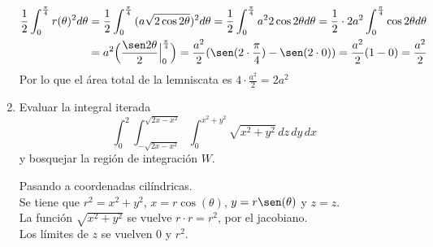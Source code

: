 \documentclass{article}
\begin{document}
\begin{enumerate}
{            \begin{align*}
                \frac{1}{2}\int_0^{\frac{\pi}{4}}{r(\theta)^2 d\theta}
                &= \frac{1}{2}\int_0^{\frac{\pi}{4}}{(a\sqrt{2\cos2\theta})^2 d\theta}
                = \frac{1}{2}\int_0^{\frac{\pi}{4}}{a^2 2\cos2\theta d\theta}
                = \frac{1}{2}\cdot 2a^2 \int_0^{\frac{\pi}{4}}{\cos2\theta d\theta}\\
                &= a^2 \Big (\frac{\sen 2\theta}{2} \Big |_0^{\frac{\pi}{4}} \Big )
                = \frac{a^2}{2} (\sen (2\cdot\frac{\pi}{4}) - \sen (2\cdot0))
                = \frac{a^2}{2} (1-0) = \frac{a^2}{2}
            \end{align*}
            Por lo que el área total de la lemniscata es
            $4 \cdot \frac{a^2}{2} = 2a^2$
        }

        \item {
            Evaluar la integral iterada
            \[
                \int_{0}^{2}{
                    \int_{-\sqrt{2x-x^2}}^{\sqrt{2x-x^2}}{
                        \int_{0}^{x^2+y^2}{
                            \sqrt{x^2+y^2}
                        \,dz}
                    \,dy}
                \,dx}
            \]
            y bosquejar la región de integración $W$.

            \color{azul}
            Pasando a coordenadas cilíndricas.\\
            Se tiene que $r^2 = x^2 + y^2$, $x = r\cos(\theta)$, $y = r\sen(\theta)$
            y $z = z$.\\
            La función $\sqrt{x^2+y^2}$ se vuelve $r \cdot r = r^2$, por el jacobiano.\\
            Los límites de $z$ se vuelven 0 y $r^2$.

}
\end{enumerate}
\end{document}
